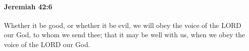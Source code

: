 
		\paragraph{Jeremiah 42:6} %
			\label{JEREMIAH-42-6}

			Whether it be good, or whether it be evil, we will obey the voice of the LORD our God, to whom we send thee; that it may be well with us, when we obey the voice of the LORD our God.



